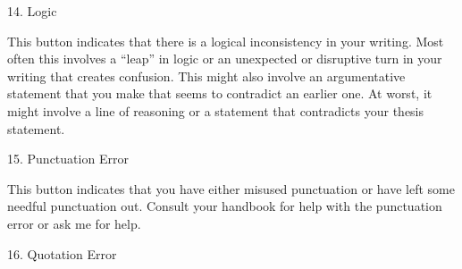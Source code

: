 \begin{center} 
\bigskip

 {\huge 14. Logic} \end{center}

This button indicates that there is a logical inconsistency in your writing.
Most often this involves a “leap” in logic or an unexpected or disruptive turn
in your writing that creates confusion. This might also involve an argumentative
statement that you make that seems to contradict an earlier one. At worst, it
might involve a line of reasoning or a statement that contradicts your thesis
statement.

 \begin{center}
\bigskip

{\huge 15. Punctuation Error} \end{center}

This button indicates that you have either misused punctuation or have left some
needful punctuation out. Consult your handbook for help with the punctuation
error or ask me for help.

 \begin{center}
\bigskip

{\huge 16. Quotation Error} \end{center}

